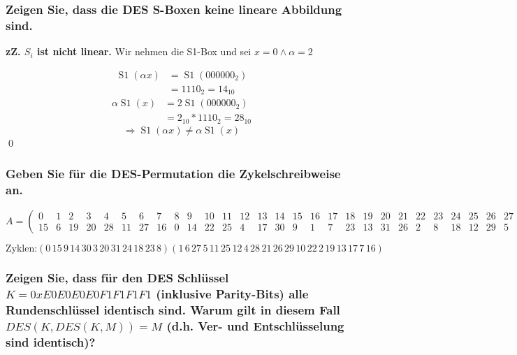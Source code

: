 \subsubsection{Zeigen Sie, dass die DES S-Boxen keine lineare Abbildung sind.}

\textbf{zZ. $S_i$ ist nicht linear.} 
Wir nehmen die S1-Box und sei $x = 0 \wedge \alpha = 2$ 

\begin{align}
 \operatorname*{S1}(\alpha x) &=  \operatorname*{S1}(000000_2)      \\
				              &= 1110_2  = 14_{10}                  
\end{align}
\begin{align}
  \alpha  \operatorname*{S1}(x) &= 2 \operatorname*{S1}(000000_2)  \\
				 &= 2_{10} * 1110_2 = 28_{10}
\end{align}
\begin{equation}
\Rightarrow 	\operatorname*{S1}(\alpha x) \ne \alpha \operatorname*{S1}(x)			
\end{equation}
\qed

\subsubsection{Geben Sie für die DES-Permutation die Zykelschreibweise an.}
\begin{equation}
A = \left (\begin{array}{*{32}{r}}
0&1&2&3&4&5&6&7&8&9&10&11&12&13&14&15&16&17&18&19&20&21&22&23&24&25&26&27&28&29&30&31	\\
15&6&19&20&28&11&27&16&0&14&22&25&4&17&30&9&1&7&23&13&31&26&2&8&18&12&29&5&21&10&3&24
\end{array}\right )
\end{equation}
	
\begin{equation}
\text{Zyklen:}  
(0\,15\,9\,14\,30\,3\,20\,31\,24\,18\,23\,8)
(1\,6\,27\,5\,11\,25\,12\,4\,28\,21\,26\,29\,10\,22\,2\,19\,13\,17\,7\,16)
\end{equation}												

\subsubsection{Zeigen Sie, dass für den DES Schlüssel $K = 0xE0E0E0E0F1F1F1F1$
(inklusive Parity-Bits) alle Rundenschlüssel identisch sind. Warum gilt in
diesem Fall $DES(K, DES(K, M)) = M$ (d.h. Ver- und Entschlüsselung sind
identisch)?}

